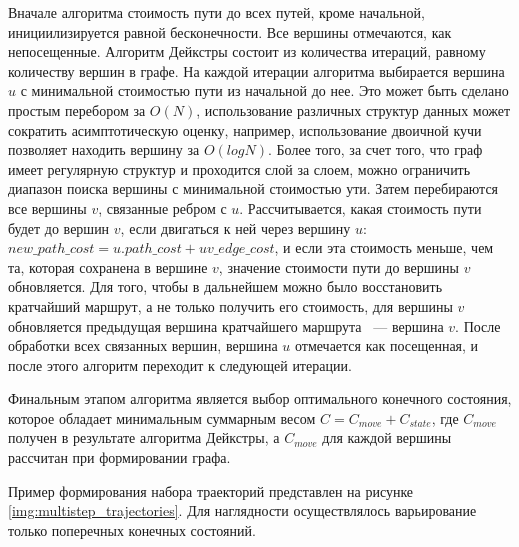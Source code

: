 Вначале алгоритма стоимость пути до всех путей, кроме начальной, инициилизируется равной бесконечности. Все вершины
отмечаются, как непосещенные.
Алгоритм Дейкстры состоит из количества итераций, равному количеству вершин в графе. На каждой итерации алгоритма
выбирается вершина $u$ с минимальной стоимостью пути из начальной до нее. Это может быть сделано
простым перебором за $O(N)$, использование различных структур данных может сократить асимптотическую оценку, например,
использование двоичной кучи позволяет находить вершину за $O(logN)$. Более того, за счет того, что граф
имеет регулярную структур и проходится слой за слоем, можно ограничить диапазон поиска вершины с минимальной стоимостью
ути. Затем перебираются все вершины $v$, связанные ребром с $u$. Рассчитывается, какая стоимость пути будет до вершин $v$,
если двигаться к ней через вершину $u$: $new\_path\_cost = u.path\_cost + uv\_edge\_cost$, и если эта стоимость меньше,
чем та, которая сохранена в вершине $v$, значение стоимости пути до вершины $v$ обновляется. Для того, чтобы в дальнейшем
можно было восстановить кратчайший маршрут, а не только получить его стоимость, для вершины $v$ обновляется предыдущая
вершина кратчайшего маршрута ~--- вершина $v$. После обработки всех связанных вершин, вершина $u$ отмечается как
посещенная, и после этого алгоритм переходит к следующей итерации.

Финальным этапом алгоритма является выбор оптимального конечного состояния, которое обладает минимальным суммарным
весом $C = C_{move} + C_{state}$, где $C_{move}$ получен в результате алгоритма Дейкстры, а $C_{move}$ для каждой
вершины рассчитан при формировании графа.


Пример формирования набора траекторий представлен на рисунке \ref{img:multistep_trajectories}. Для наглядности
осуществлялось варьирование только поперечных конечных состояний.

